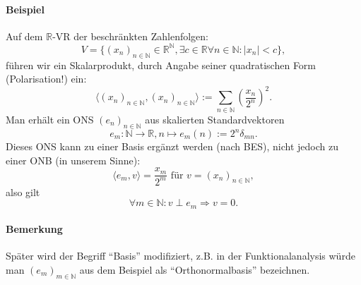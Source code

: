 \paragraph{Beispiel}
	Auf dem $ \mathbb{R} $-VR der beschränkten Zahlenfolgen:
		\[ V=\{(x_n)_{n\in \mathbb{N}}\in \mathbb{R}^\mathbb{N}, \exists c\in \mathbb{R}\forall n\in \mathbb{N}: |x_n|<c \}, \]
	führen wir ein Skalarprodukt, durch Angabe seiner quadratischen Form (Polarisation!) ein:
		\[ \langle (x_n)_{n\in \mathbb{N}},(x_n)_{n\in \mathbb{N}}\rangle := \sum_{n\in \mathbb{N}}\left(\frac{x_n}{2^n}\right)^2.  \]
	Man erhält ein ONS $ (e_n)_{n\in \mathbb{N}} $ aus skalierten Standardvektoren
		\[ e_m:\mathbb{N}\to \mathbb{R}, n\mapsto e_m(n):= 2^n\delta_{mn}. \]
	Dieses ONS kann zu einer Basis ergänzt werden (nach BES), nicht jedoch zu einer ONB (in unserem Sinne):
		\[ \langle e_m, v\rangle = \frac{x_m}{2^m} \text{ für } v=(x_{n})_{n\in \mathbb{N}}, \]
	also gilt
		\[ \forall m\in \mathbb{N}: v\perp e_m \Rightarrow v = 0. \]
\paragraph{Bemerkung}
	Später wird der Begriff "`Basis"' modifiziert, z.B. in der Funktionalanalysis würde man $ (e_m)_{m\in \mathbb{N}} $ aus dem Beispiel als "`Orthonormalbasis"' bezeichnen.